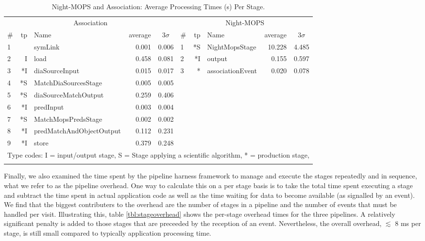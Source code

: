 \begin{table}[htbp]
\begin{center}
\small
\caption{Night-MOPS and Association: Average Processing Times (s) Per
  Stage.
\label{tbl:otherstagetimes}}
\vspace{\baselineskip}
\begin{tabular}{lrlrr|lrlrr}
\hline\hline
\multicolumn{5}{c|}{Association} & \multicolumn{5}{c}{Night-MOPS} \\
\# & tp & Name & \multicolumn{1}{c}{average}&\multicolumn{1}{c|}{$3\sigma$} &
\# & tp & Name & \multicolumn{1}{c}{average}&\multicolumn{1}{c}{$3\sigma$} \\ 
\hline
1 &    & symLink                  &  0.001 &  0.006 & 1 & *S & NightMopsStage           & 10.228 &  4.485 \\ 
2 &  I & load                     &  0.458 &  0.081 & 2 & *I & output                   &  0.155 &  0.597 \\ 
3 & *I & diaSourceInput           &  0.015 &  0.017 & 3 & *\phantom{I}  & associationEvent         &  0.020 &  0.078 \\ 
4 & *S & MatchDiaSourcesStage     &  0.005 &  0.005 &&&&&\\ 
5 & *S & diaSourceMatchOutput     &  0.259 &  0.406 &&&&&\\ 
6 & *I & predInput                &  0.003 &  0.004 &&&&&\\ 
7 & *S & MatchMopsPredsStage      &  0.002 &  0.002 &&&&&\\ 
8 & *I & predMatchAndObjectOutput &  0.112 &  0.231 &&&&&\\ 
9 & *I & store                    &  0.379 &  0.248 &&&&&\\ 
\hline
\multicolumn{10}{l}{Type codes: I = input/output stage, S = Stage
  applying a scientific algorithm, * = production stage,} \\
\multicolumn{5}{l}{} \\
\end{tabular}
\end{center}
\end{table}
Finally, we also examined the time spent by the pipeline harness
framework to manage and execute the stages repeatedly and in
sequence, what we refer to as the pipeline overhead.  One way to
calculate this on a per stage basis is to take the total time spent
executing a stage and subtract the time spent in actual application
code as well as the time waiting for data to become available (as
signalled by an event).  We find that the biggest contributers to the
overhead are the number of stages in a pipeline and the number of
events that must be handled per visit.  Illustrating this,
table \ref{tbl:stageoverhead} shows the per-stage overhead times for
the three pipelines.  A relatively significant penalty is added to
those stages that are preceeded by the reception of an event.
Nevertheless, the overall overhead, $\lesssim $ 8 ms per stage, is still
small compared to typically application processing time.  

